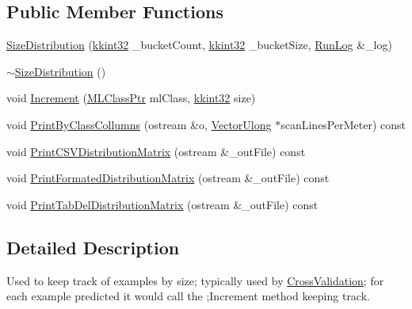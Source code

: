 \subsection*{Public Member Functions}
\begin{DoxyCompactItemize}
\item 
\hyperlink{class_k_k_m_l_l_1_1_size_distribution_ad7a351e184b07909df7fb6712b036279}{Size\+Distribution} (\hyperlink{namespace_k_k_b_a8fa4952cc84fda1de4bec1fbdd8d5b1b}{kkint32} \+\_\+bucket\+Count, \hyperlink{namespace_k_k_b_a8fa4952cc84fda1de4bec1fbdd8d5b1b}{kkint32} \+\_\+bucket\+Size, \hyperlink{class_k_k_b_1_1_run_log}{Run\+Log} \&\+\_\+log)
\item 
\hyperlink{class_k_k_m_l_l_1_1_size_distribution_ac440c714d6088a049d91a24cd41f6d8a}{$\sim$\+Size\+Distribution} ()
\item 
void \hyperlink{class_k_k_m_l_l_1_1_size_distribution_a51716c82e9fceab27ab5791073143d4a}{Increment} (\hyperlink{namespace_k_k_m_l_l_ac272393853d59e72e8456f14cd6d8c23}{M\+L\+Class\+Ptr} ml\+Class, \hyperlink{namespace_k_k_b_a8fa4952cc84fda1de4bec1fbdd8d5b1b}{kkint32} size)
\item 
void \hyperlink{class_k_k_m_l_l_1_1_size_distribution_abb5391cadeee9c6a70c6ffa4e7584432}{Print\+By\+Class\+Collumns} (ostream \&o, \hyperlink{namespace_k_k_b_ac8e4b77afddb0db278beb180dae0b6dc}{Vector\+Ulong} $\ast$scan\+Lines\+Per\+Meter) const 
\item 
void \hyperlink{class_k_k_m_l_l_1_1_size_distribution_a469d784eb82dbce90af7b9a2f90697e8}{Print\+C\+S\+V\+Distribution\+Matrix} (ostream \&\+\_\+out\+File) const 
\item 
void \hyperlink{class_k_k_m_l_l_1_1_size_distribution_a3a1017d7e7216e497fb5c8d4091f99c3}{Print\+Formated\+Distribution\+Matrix} (ostream \&\+\_\+out\+File) const 
\item 
void \hyperlink{class_k_k_m_l_l_1_1_size_distribution_a2c073b27bb7de079182baf892933d04a}{Print\+Tab\+Del\+Distribution\+Matrix} (ostream \&\+\_\+out\+File) const 
\end{DoxyCompactItemize}


\subsection{Detailed Description}
Used to keep track of examples by size; typically used by \textquotesingle{}\hyperlink{class_k_k_m_l_l_1_1_cross_validation}{Cross\+Validation}\textquotesingle{}; for each example predicted it would call the ;Increment\textquotesingle{} method keeping track. 

